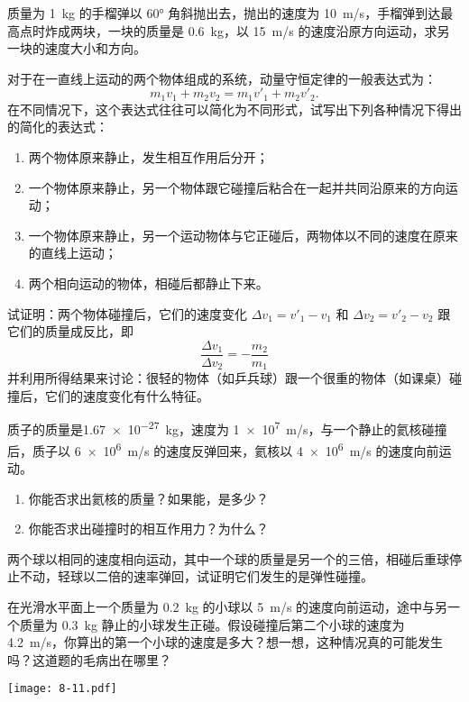 \begin{Exercise}
\begin{question}
  \item 质量为 \qty{1}{kg} 的手榴弹以 \ang{60} 角斜抛出去，抛出的速度为 \qty{10}{m/s}，手榴弹到达最高点时炸成两块，一块的质量是 \qty{0.6}{kg}，以 \qty{15}{m/s} 的速度沿原方向运动，求另一块的速度大小和方向。
  \item 对于在一直线上运动的两个物体组成的系统，动量守恒定律的一般表达式为：
\[m_1v_1+m_2v_2=m_1v'_1+m_2v'_2.\]
  在不同情况下，这个表达式往往可以简化为不同形式，试写出下列各种情况下得出的简化的表达式：
\begin{enumerate}
  \item 两个物体原来静止，发生相互作用后分开；
  \item 一个物体原来静止，另一个物体跟它碰撞后粘合在一起并共同沿原来的方向运动；
  \item 一个物体原来静止，另一个运动物体与它正碰后，两物体以不同的速度在原来的直线上运动；
  \item 两个相向运动的物体，相碰后都静止下来。
\end{enumerate}
  \item 试证明：两个物体碰撞后，它们的速度变化 $\Delta v_1=v'_1-v_1$ 和 $\Delta v_2=v'_2-v_2$ 跟它们的质量成反比，即
  \[\frac{\Delta v_1}{\Delta v_2}=-\frac{m_2}{m_1}\]
  并利用所得结果来讨论：很轻的物体（如乒兵球）跟一个很重的物体（如课桌）碰撞后，它们的速度变化有什么特征。
  \item 质子的质量是\qty{1.67e-27}{kg}，速度为 \qty{1e7}{m/s}，与一个静止的氦核碰撞后，质子以 \qty{6e6}{m/s} 的速度反弹回来，氦核以 \qty{4e6}{m/s} 的速度向前运动。
  \begin{enumerate}
    \item 你能否求出氦核的质量？如果能，是多少？
    \item 你能否求出碰撞时的相互作用力？为什么？
  \end{enumerate}
  \item 两个球以相同的速度相向运动，其中一个球的质量是另一个的三倍，相碰后重球停止不动，轻球以二倍的速率弹回，试证明它们发生的是弹性碰撞。
   \item 在光滑水平面上一个质量为 \qty{0.2}{kg} 的小球以 \qty{5}{m/s} 的速度向前运动，途中与另一个质量为 \qty{0.3}{kg} 静止的小球发生正碰。假设碰撞后第二个小球的速度为 \qty{4.2}{m/s}，你算出的第一个小球的速度是多大？想一想，这种情况真的可能发生吗？这道题的毛病出在哪里？
\begin{figurehere}
  \begin{minipage}{\linewidth}\centering
    \texttt{[image: 8-11.pdf]}

\end{minipage}
\end{figurehere}
\end{question}
\end{Exercise}
